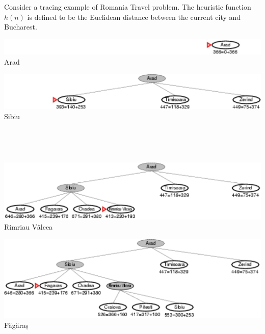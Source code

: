 \begin{example}
    Consider a tracing example of Romania Travel problem. The heuristic function $h(n)$ is defined to be the Euclidean distance between the current city and Bucharest.

    \begin{minipage}[t]{0.45\linewidth} \begin{center} \includegraphics[width=\linewidth]{figures/a-star-search/1.png} Arad \end{center} \end{minipage}
    \hfill%
    \begin{minipage}[t]{0.45\linewidth} \begin{center} \includegraphics[width=\linewidth]{figures/a-star-search/2.png} Sibiu \end{center} \end{minipage}

    {~~~}

    {~~~}

    \begin{minipage}[t]{0.45\linewidth} \begin{center} \includegraphics[width=\linewidth]{figures/a-star-search/3.png} Rimriau Vâlcea \end{center} \end{minipage}
    \hfill%
    \begin{minipage}[t]{0.45\linewidth} \begin{center} \includegraphics[width=\linewidth]{figures/a-star-search/4.png} Făgăraș \end{center} \end{minipage}


\end{example}
